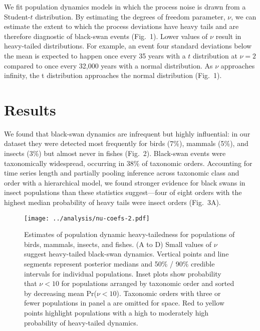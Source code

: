 \documentclass[9pt,twocolumn,twoside]{pnas-new}
\begin{document}
We fit population dynamics models in which the process noise is
drawn from a Student-$t$ distribution. By estimating the degrees of freedom
parameter, \(\nu\), we can estimate the extent to which the process deviations
have heavy tails and are therefore diagnostic of black-swan events (Fig.~1).
Lower values of \(\nu\) result in heavy-tailed distributions.
For example, an event four standard deviations below the mean
is expected to happen once every 35 years with a $t$ distribution at \(\nu = 2\)
compared to once every 32,000 years with a normal distribution.
As \(\nu\) approaches infinity, the t
distribution approaches the normal distribution (Fig.~1).

\section*{Results}

We found that black-swan dynamics are infrequent but highly
influential: in our dataset they were detected most
frequently for birds (7\%), mammals (5\%), and
insects (3\%) but almost never in fishes (Fig.~2). Black-swan
events were taxonomically widespread, occurring in 38\% of taxonomic orders.
Accounting for time series length and partially pooling inference across
taxonomic class and order with a hierarchical model, we found stronger evidence
for black swans in insect populations than these statistics suggest---four of
eight orders with the highest median probability of heavy tails were insect
orders (Fig.~3A).

\begin{figure}[htb]
\centering
\texttt{[image: ../analysis/nu-coefs-2.pdf]}
\caption{Estimates of population dynamic heavy-tailedness for
populations of birds, mammals, insects, and fishes. (A to D)
Small values of \(\nu\) suggest heavy-tailed black-swan dynamics. Vertical
points and line segments represent posterior medians and 50\% / 90\% credible
intervals for individual populations. Inset plots show probability that \(\nu
< 10\) for populations arranged by taxonomic order and sorted by decreasing
mean Pr(\(\nu < 10\)). Taxonomic orders with three or fewer populations in
panel a are omitted for space. Red to yellow points highlight populations
with a high to moderately high probability of heavy-tailed dynamics.
}
\label{fig:2}
\end{figure}
\end{document}
